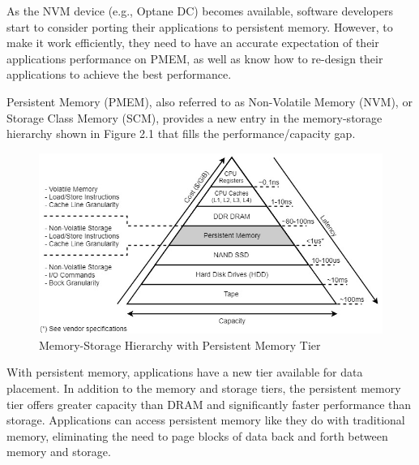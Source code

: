 \documentclass[11pt,swedish, openany, oneside]{book}
\begin{document}
As the NVM device (e.g., Optane DC) becomes available, software developers start to consider porting their applications to persistent memory. However, to make it work efficiently, they need to have an accurate expectation of their applications performance on PMEM, as well as know how to re-design their applications to achieve the best performance.\cite{islam_narayanan_york_dai}

Persistent Memory (PMEM), also referred to as Non-Volatile Memory (NVM), or Storage Class Memory (SCM), provides a new entry in the memory-storage hierarchy shown in Figure 2.1 that fills the performance/capacity gap.\cite{pmemdoc}

\begin{figure}[H]
   \centering
   \includegraphics[width=0.6\linewidth]{itpm.png}
   \caption{Memory-Storage Hierarchy with Persistent Memory Tier\cite{pmemdoc}}
\end{figure}

With persistent memory, applications have a new tier available for data placement. In addition to the memory and storage tiers, the persistent memory tier offers greater capacity than DRAM and significantly faster performance than storage. Applications can access persistent memory like they do with traditional memory, eliminating the need to page blocks of data back and forth between memory and storage.\cite{pmemdoc}
\end{document}
